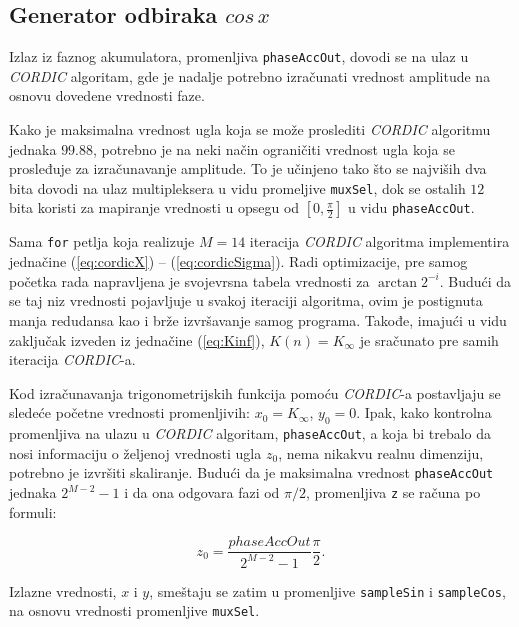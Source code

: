 \documentclass[conference]{IEEEtran}
\begin{document}
\subsection{Generator odbiraka $cos\,x$}
Izlaz iz faznog akumulatora, promenljiva \texttt{phaseAccOut}, dovodi se na ulaz u \textit{CORDIC} algoritam, gde je nadalje potrebno izračunati vrednost amplitude na osnovu dovedene vrednosti faze.

Kako je maksimalna vrednost ugla koja se može proslediti \textit{CORDIC} algoritmu jednaka $99.88$\textdegree, potrebno je na neki način ograničiti vrednost ugla koja se prosleđuje za izračunavanje amplitude. To je učinjeno tako što se najviših dva bita dovodi na ulaz multipleksera u vidu promeljive \texttt{muxSel}, dok se ostalih $12$ bita koristi za mapiranje vrednosti u opsegu od $[0, \frac{\pi}{2}]$ u vidu \texttt{phaseAccOut}.

Sama \texttt{for} petlja koja realizuje $M=14$ iteracija \textit{CORDIC} algoritma implementira jednačine (\ref{eq:cordicX}) -- (\ref{eq:cordicSigma}). Radi optimizacije, pre samog početka rada napravljena je svojevrsna tabela vrednosti za $\arctan{2^{-i}}$. Budući da se taj niz vrednosti pojavljuje u svakoj iteraciji algoritma, ovim je postignuta manja redudansa kao i brže izvršavanje samog programa. Takođe, imajući u vidu zaključak izveden iz jednačine (\ref{eq:Kinf}), $K(n) = K_{\infty}$ je sračunato pre samih iteracija \textit{CORDIC}-a.

Kod izračunavanja trigonometrijskih funkcija pomoću \textit{CORDIC}-a postavljaju se sledeće početne vrednosti promenljivih: $x_0=K_{\infty}$, $y_0=0$. Ipak, kako kontrolna promenljiva na ulazu u \textit{CORDIC} algoritam, \texttt{phaseAccOut}, a koja bi trebalo da nosi informaciju o željenoj vrednosti ugla $z_0$, nema nikakvu realnu dimenziju, potrebno je izvršiti skaliranje. Budući da je maksimalna vrednost \texttt{phaseAccOut} jednaka $2^{M-2}-1$ i da ona odgovara fazi od $\pi/2$, promenljiva \texttt{z} se računa po formuli:

\begin{equation}
z_0 = \frac{phaseAccOut}{2^{M-2}-1} \frac{\pi}{2} .
\end{equation}

Izlazne vrednosti, $x$ i $y$, smeštaju se zatim u promenljive \texttt{sampleSin} i \texttt{sampleCos}, na osnovu vrednosti promenljive \texttt{muxSel}.


\end{document}
